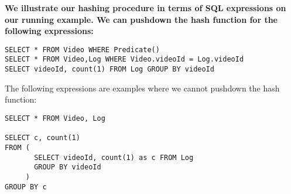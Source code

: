 \begin{example}\bf
We illustrate our hashing procedure in terms of SQL expressions on our running example.
We can pushdown the hash function for the following expressions:
\begin{lstlisting}
SELECT * FROM Video WHERE Predicate()
SELECT * FROM Video,Log WHERE Video.videoId = Log.videoId
SELECT videoId, count(1) FROM Log GROUP BY videoId
\end{lstlisting}
\vspace{0.3em}
The following expressions are examples where we cannot pushdown the hash function:
\begin{lstlisting}
SELECT * FROM Video, Log

SELECT c, count(1)
FROM ( 
       SELECT videoId, count(1) as c FROM Log 
       GROUP BY videoId
     )
GROUP BY c
\end{lstlisting}

\end{example}

